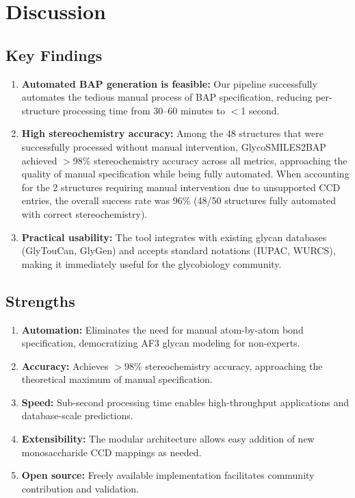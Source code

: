 \section{Discussion}

\subsection{Key Findings}

\begin{enumerate}
\item \textbf{Automated BAP generation is feasible:} Our pipeline successfully automates the tedious manual process of BAP specification, reducing per-structure processing time from 30--60 minutes to $<$1 second.

\item \textbf{High stereochemistry accuracy:} Among the 48 structures that were successfully processed without manual intervention, GlycoSMILES2BAP achieved $>$98\% stereochemistry accuracy across all metrics, approaching the quality of manual specification while being fully automated. When accounting for the 2 structures requiring manual intervention due to unsupported CCD entries, the overall success rate was 96\% (48/50 structures fully automated with correct stereochemistry).

\item \textbf{Practical usability:} The tool integrates with existing glycan databases (GlyTouCan, GlyGen) and accepts standard notations (IUPAC, WURCS), making it immediately useful for the glycobiology community.
\end{enumerate}

\subsection{Strengths}

\begin{enumerate}
\item \textbf{Automation:} Eliminates the need for manual atom-by-atom bond specification, democratizing AF3 glycan modeling for non-experts.

\item \textbf{Accuracy:} Achieves $>$98\% stereochemistry accuracy, approaching the theoretical maximum of manual specification.

\item \textbf{Speed:} Sub-second processing time enables high-throughput applications and database-scale predictions.

\item \textbf{Extensibility:} The modular architecture allows easy addition of new monosaccharide CCD mappings as needed.

\item \textbf{Open source:} Freely available implementation facilitates community contribution and validation.
\end{enumerate}

